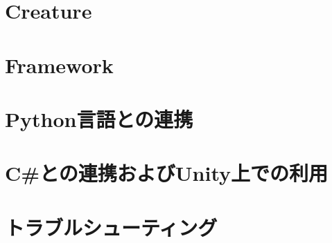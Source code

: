 \chapter{Creature}
\label{chap_creature}
%

\chapter{Framework}
\label{chap_framework}
%

\chapter{Python言語との連携}
\label{chap_embpython}
%

\chapter{C\#との連携およびUnity上での利用}
\label{chap_unity}
%

\chapter{トラブルシューティング}
\label{chap_trouble}
%

